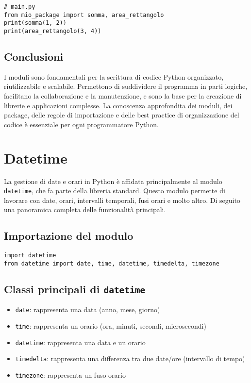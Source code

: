 \documentclass[a4paper,12pt]{article}
\begin{document}
\begin{lstlisting}
# main.py
from mio_package import somma, area_rettangolo
print(somma(1, 2))
print(area_rettangolo(3, 4))
\end{lstlisting}

\subsection*{Conclusioni}
I moduli sono fondamentali per la scrittura di codice Python organizzato, riutilizzabile e scalabile. Permettono di suddividere il programma in parti logiche, facilitano la collaborazione e la manutenzione, e sono la base per la creazione di librerie e applicazioni complesse. La conoscenza approfondita dei moduli, dei package, delle regole di importazione e delle best practice di organizzazione del codice è essenziale per ogni programmatore Python.

\section{Datetime}
La gestione di date e orari in Python è affidata principalmente al modulo \texttt{datetime}, che fa parte della libreria standard. Questo modulo permette di lavorare con date, orari, intervalli temporali, fusi orari e molto altro. Di seguito una panoramica completa delle funzionalità principali.

\subsection*{Importazione del modulo}
\begin{lstlisting}
import datetime
from datetime import date, time, datetime, timedelta, timezone
\end{lstlisting}

\subsection*{Classi principali di \texttt{datetime}}
\begin{itemize}
    \item \texttt{date}: rappresenta una data (anno, mese, giorno)
    \item \texttt{time}: rappresenta un orario (ora, minuti, secondi, microsecondi)
    \item \texttt{datetime}: rappresenta una data e un orario
    \item \texttt{timedelta}: rappresenta una differenza tra due date/ore (intervallo di tempo)
    \item \texttt{timezone}: rappresenta un fuso orario
\end{itemize}
\end{document}
